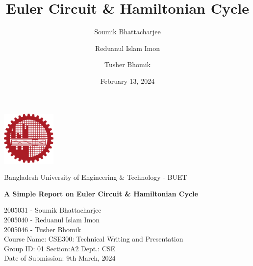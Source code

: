 \documentclass[14pt, times, a4paper]{extarticle}
\title{Euler Circuit \& Hamiltonian Cycle}
\author{Soumik Bhattacharjee \and Reduanul Islam Imon \and Tusher Bhomik}
\date{February 13, 2024}
\begin{document}
\begin{titlepage}
    \centering
    \includegraphics[width=0.2\textwidth]{images/buet_logo.png}\\[1cm]
    {\Large Bangladesh University of Engineering \& Technology - BUET\par}
    \vspace{2.5cm}
    {\huge\bfseries A Simple Report on Euler Circuit \& Hamiltonian Cycle\par}
    \vspace{3cm}
    \Large
    2005031 - Soumik Bhattacharjee\\
    2005040 - Reduanul Islam Imon\\
    2005046 - Tusher Bhomik\\[2cm]
    \large
    Course Name: CSE300: Technical Writing and Presentation\\
    Group ID: 01 \hspace{2cm} Section:A2 \hspace{2cm} Dept.: CSE\\
    Date of Submission: 9th March, 2024
\end{titlepage}


\pagecolor{white}


\end{document}

